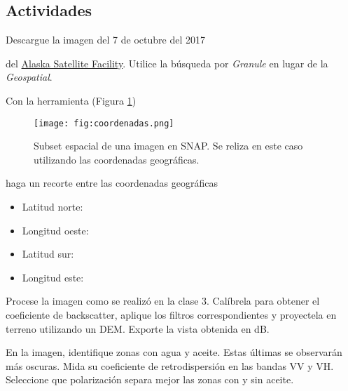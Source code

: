 

\subsection{Actividades}

\begin{que}
    Descargue la imagen del 7 de octubre del 2017
    \begin{center}\end{center} del \href{https://vertex.daac.asf.alaska.edu/}{Alaska Satellite Facility}. Utilice la búsqueda por \emph{Granule} en lugar de la \emph{Geospatial}.
\end{que}

\begin{que}
    Con la herramienta  (Figura \ref{fig:coordenadas})
    \begin{figure}[h!]
        \centering
        \texttt{[image: fig:coordenadas.png]}
        \caption{Subset espacial de una imagen en SNAP. Se reliza en este caso utilizando las coordenadas geográficas.}
        \label{fig:coordenadas}
    \end{figure}

    haga un recorte entre las coordenadas geográficas
    \begin{itemize}
        \item Latitud norte:
        \item Longitud oeste:
        \item Latitud sur:
        \item Longitud este:
    \end{itemize}

\end{que}

\begin{que}
    Procese la imagen como se realizó en la clase 3. Calíbrela para obtener el coeficiente de backscatter, aplique los filtros correspondientes y proyectela en terreno utilizando un DEM. Exporte la vista obtenida en dB.
\end{que}

\begin{que}
    En la imagen, identifique zonas con agua y aceite. Estas últimas se observarán más oscuras. Mida su coeficiente de retrodispersión en las bandas VV y VH. Seleccione que polarización separa mejor las zonas con y sin aceite.
\end{que}


